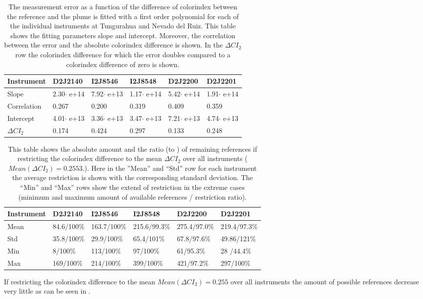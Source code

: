 	\begin{table}[h]
	\centering
	\begin{tabular}{|p{2cm}|p{2cm}|p{2cm}|p{2cm}|p{2cm}|p{2cm}|}
		Instrument	&D2J2140&I2J8546& I2J8548&D2J2200&D2J2201\\
		\toprule
		Slope&2.30$\cdot$ e+14 &7.92$\cdot$ e+13 &1.17$\cdot$ e+14 &5.42$\cdot$ e+14&1.91$\cdot$ e+14\\
		\midrule
		Correlation&
		0.267&
		0.200&
		0.319&
		0.409&
		0.359\\
		\midrule
		Intercept&4.01$\cdot$ e+13&3.36$\cdot$ e+13&3.47$\cdot$ e+13& 7.21$\cdot$ e+13& 4.74$\cdot$ e+13\\
		\midrule
		$\Delta CI_{2}$&0.174&0.424&0.297&0.133&0.248\\
		\bottomrule
	\end{tabular}
	\caption{The  measurement error as a function of the difference of colorindex between the reference and the plume is fitted with a first order polynomial for each of the individual instruments at Tungurahua and Nevado del Ruiz. This table shows the fitting parameters slope and intercept. Moreover, the correlation between the  error and the absolute colorindex difference is shown. In the $\Delta CI_{2}$ row the colorindex difference for which the error doubles compared to a colorindex difference of zero is shown.}
	\label{tab:colidxcalc}
\end{table}

	\begin{table}[h]
	\centering
	\begin{tabular}{|p{1.8cm}|p{2.15cm}|p{2.15cm}|p{2.15cm}|p{2.15cm}|p{2.15cm}|}
		Instrument	&D2J2140&I2J8546& I2J8548&D2J2200&D2J2201\\
		\toprule
		Mean&
		84.6/100\% &	163.7/100\%&	215.6/99.3\%&
		275.4/97.0\% &219.4/97.3\% \\
		\midrule
		Std&
		35.8/100\% &	29.9/100\% &
		65.4/101\%&
		67.8/97.6\% &
		49.86/121\% \\
		\midrule
		Min&
		8/100\% &
		113/100\% 
		&97/100\% 
		&61/95.3\% 
		&28	/44.4\% \\
		\midrule
		Max
		&169/100\% 
		&214/100\% 
		&399/100\% 
		&421/97.2\% 
		&297/100\%  \\
		\bottomrule
	\end{tabular}
	\caption{This table shows the absolute amount and the ratio  (to ) of remaining references if restricting the colorindex difference to the mean $\Delta CI_{2}$ over all instruments ($Mean(\Delta CI_{2}) = 0.2553.$). Here in the ”Mean” and “Std” row for each  instrument the average restriction is shown with the corresponding standard deviation. The “Min” and “Max” rows show the extend of restriction in the extreme cases (minimum and maximum amount of available references / restriction ratio).}
	\label{tab:colidxres}
\end{table}	
If restricting the colorindex difference to the mean $Mean(\Delta CI_{2}) = 0.255$ over all instruments the amount of possible references decrease very little as can be seen in .\\

